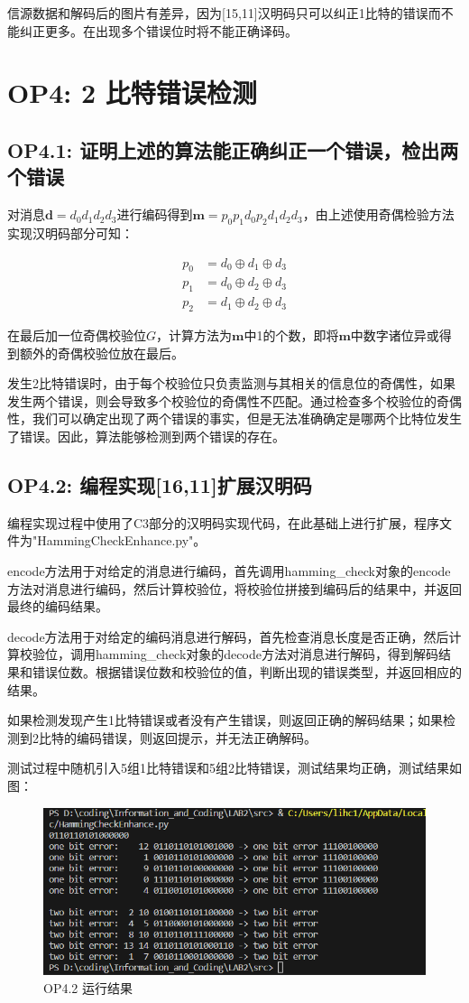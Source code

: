 \documentclass[12pt, a4paper]{ctexart}
\begin{document}
    信源数据和解码后的图片有差异，因为[15,11]汉明码只可以纠正1比特的错误而不能纠正更多。在出现多个错误位时将不能正确译码。

\section*{OP4: 2 比特错误检测}

\subsection*{OP4.1: 证明上述的算法能正确纠正一个错误，检出两个错误}

    对消息$\bm{d} = d_0d_1d_2d_3$进行编码得到$\bm{m} = p_0p_1d_0p_2d_1d_2d_3$，由上述使用奇偶检验方法实现汉明码部分可知：
    
    $$
    \begin{aligned}
    p_0 &= d_0 \oplus d_1 \oplus d_3\\
    p_1 &= d_0 \oplus d_2 \oplus d_3\\
    p_2 &= d_1 \oplus d_2 \oplus d_3
    \end{aligned}
    $$

    在最后加一位奇偶校验位$G$，计算方法为$\bm{m}$中1的个数，即将$\bm{m}$中数字诸位异或得到额外的奇偶校验位放在最后。
 
    发生2比特错误时，由于每个校验位只负责监测与其相关的信息位的奇偶性，如果发生两个错误，则会导致多个校验位的奇偶性不匹配。通过检查多个校验位的奇偶性，我们可以确定出现了两个错误的事实，但是无法准确确定是哪两个比特位发生了错误。因此，算法能够检测到两个错误的存在。

\subsection*{OP4.2: 编程实现[16,11]扩展汉明码}

    编程实现过程中使用了C3部分的汉明码实现代码，在此基础上进行扩展，程序文件为"HammingCheckEnhance.py"。

    encode方法用于对给定的消息进行编码，首先调用hamming\_check对象的encode方法对消息进行编码，然后计算校验位，将校验位拼接到编码后的结果中，并返回最终的编码结果。

    decode方法用于对给定的编码消息进行解码，首先检查消息长度是否正确，然后计算校验位，调用hamming\_check对象的decode方法对消息进行解码，得到解码结果和错误位数。根据错误位数和校验位的值，判断出现的错误类型，并返回相应的结果。

    如果检测发现产生1比特错误或者没有产生错误，则返回正确的解码结果；如果检测到2比特的编码错误，则返回提示，并无法正确解码。

    测试过程中随机引入5组1比特错误和5组2比特错误，测试结果均正确，测试结果如图：
    \begin{figure}[H]
        \centering
        \includegraphics[width=12cm]{./pic/4-1.png}		
        \caption{OP4.2 运行结果}
    \end{figure}
\end{document}
